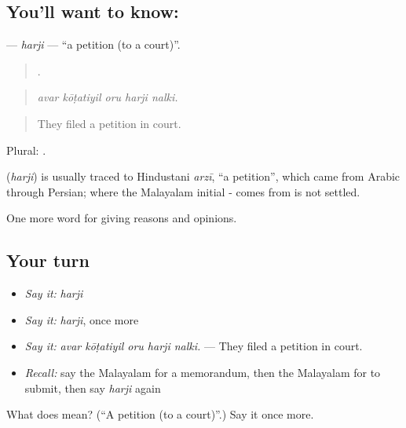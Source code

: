 \subsection*{You'll want to know: }
\textbf{} — \emph{harji} — \textquotedblleft{}a petition (to a court)\textquotedblright{}.

\begin{quote}
    .
\end{quote}

\begin{quote}
\emph{avar kōṭatiyil oru harji nalki.}
\end{quote}

\begin{quote}
They filed a petition in court.
\end{quote}

Plural: .

\begin{cousinweb}
\textbf{} (\emph{harji}) is usually traced to Hindustani \emph{arzī}, \textquotedblleft{}a petition\textquotedblright{}, which came from Arabic through Persian; where the Malayalam initial - comes from is not settled.
\end{cousinweb}

\begin{grammarlens}[title={What you've built}]
One more word for giving reasons and opinions.
\end{grammarlens}

\subsection*{Your turn}
\begin{itemize}
\raggedright
  \item \emph{Say it:} \emph{harji}
  \item \emph{Say it:} \emph{harji}, once more
  \item \emph{Say it:} \emph{avar kōṭatiyil oru harji nalki.} — They filed a petition in court.
  \item \emph{Recall:} say the Malayalam for a memorandum, then the Malayalam for to submit, then say \emph{harji} again
\end{itemize}

\begin{tcolorbox}[breakable,colback=teal!4,colframe=teal!35!black,title={Before you move on}]
What does  mean? (\textquotedblleft{}A petition (to a court)\textquotedblright{}.) Say it once more.
\end{tcolorbox}
